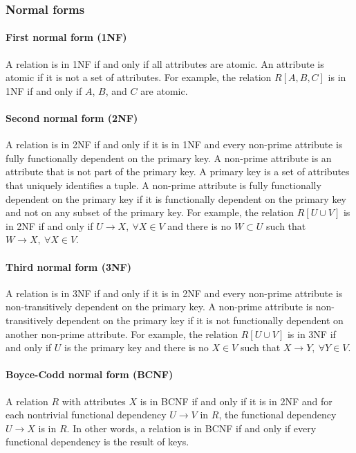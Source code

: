 \subsubsection{Normal forms}

\paragraph{First normal form (1NF)}  A relation is in 1NF if and only if all attributes
are atomic.  An attribute is atomic if it is not a set of attributes.  For example, the
relation $R[A, B, C]$ is in 1NF if and only if $A$, $B$, and $C$ are atomic.

\paragraph{Second normal form (2NF)}  A relation is in 2NF if and only if it is in 1NF
and every non-prime attribute is fully functionally dependent on the primary key.  A
non-prime attribute is an attribute that is not part of the primary key.  A primary key
is a set of attributes that uniquely identifies a tuple.  A non-prime attribute is fully
functionally dependent on the primary key if it is functionally dependent on the primary
key and not on any subset of the primary key.  For example, the relation $R[U \cup V]$ is
in 2NF if and only if $U \to X,~\forall X \in V$ and there is no $W \subset U$ such that
$W \to X,~\forall X \in V$.

\paragraph{Third normal form (3NF)}  A relation is in 3NF if and only if it is in 2NF
and every non-prime attribute is non-transitively dependent on the primary key.  A
non-prime attribute is non-transitively dependent on the primary key if it is not
functionally dependent on another non-prime attribute.  For example, the relation $R[U
\cup V]$ is in 3NF if and only if $U$ is the primary key and there is no $X \in V$ such
that $X \to Y,~\forall Y \in V$.

\paragraph{Boyce-Codd normal form (BCNF)}  A relation $R$ with attributes $X$ is in BCNF
if and only if it is in 2NF and for each nontrivial functional dependency $U \to V$ in
$R$, the functional dependency $U \to X$ is in $R$.  In other words, a relation is in BCNF
if and only if every functional dependency is the result of keys.

